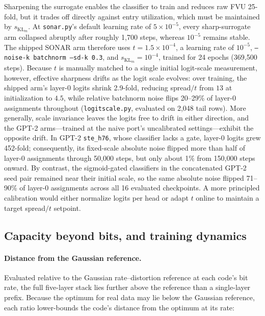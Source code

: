 Sharpening the surrogate enables the classifier to train and reduces raw
FVU 25-fold, but it trades off directly against entry utilization, which
must be maintained by $s_{\mathrm{KL}_m}$. At \texttt{sonar.py}'s default
learning rate of $5\times10^{-5}$, every sharp-surrogate arm collapsed
abruptly after roughly 1{,}700 steps, whereas $10^{-5}$ remains stable.
The shipped SONAR arm therefore uses $t{=}1.5\times10^{-4}$, a learning
rate of $10^{-5}$, \texttt{--noise-k batchnorm --sd-k 0.3}, and
$s_{\mathrm{KL}_m}{=}10^{-4}$, trained for 24 epochs (369{,}500 steps).
Because $t$ is manually matched to a single initial logit-scale
measurement, however, effective sharpness drifts as the logit scale
evolves: over training, the shipped arm's layer-0 logits shrink 2.9-fold,
reducing spread$/t$ from $13$ at initialization to $4.5$, while relative
batchnorm noise flips 20--29\% of layer-0 assignments throughout
(\texttt{logitscale.py}, evaluated on 2{,}048 tail rows). More generally,
scale invariance leaves the logits free to drift in either direction, and
the GPT-2 arms---trained at the naive port's uncalibrated
settings---exhibit the opposite drift. In GPT-2 \texttt{ste\_h76}, whose
classifier lacks a gate, layer-0 logits grew 452-fold; consequently, its
fixed-scale absolute noise flipped more than half of layer-0 assignments
through 50{,}000 steps, but only about 1\% from 150{,}000 steps onward. By
contrast, the sigmoid-gated classifiers in the concatenated GPT-2 seed
pair remained near their initial scale, so the same absolute noise flipped
71--90\% of layer-0 assignments across all 16 evaluated checkpoints. A
more principled calibration would either normalize logits per head or
adapt $t$ online to maintain a target spread$/t$ setpoint.

\subsection{Capacity beyond bits, and training dynamics}
\label{sec:capacity}

\paragraph{Distance from the Gaussian reference.} Evaluated relative to
the Gaussian rate--distortion reference at each code's bit rate, the full
five-layer stack lies further above the reference than a single-layer
prefix. Because the optimum for real data may lie below the Gaussian
reference, each ratio lower-bounds the code's distance from the optimum
at its rate:

